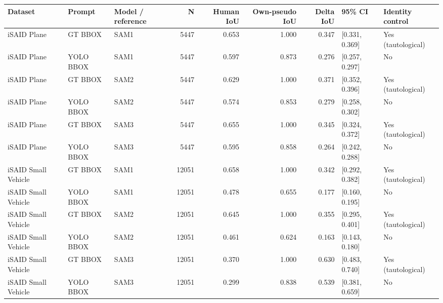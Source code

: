 \begin{tabular}{lllrrrrll}
\toprule
Dataset & Prompt & Model / reference & N & Human IoU & Own-pseudo IoU & Delta IoU & 95\% CI & Identity control \\
\midrule
iSAID Plane & GT BBOX & SAM1 & 5447 & 0.653 & 1.000 & 0.347 & [0.331, 0.369] & Yes (tautological) \\
iSAID Plane & YOLO BBOX & SAM1 & 5447 & 0.597 & 0.873 & 0.276 & [0.257, 0.297] & No \\
iSAID Plane & GT BBOX & SAM2 & 5447 & 0.629 & 1.000 & 0.371 & [0.352, 0.396] & Yes (tautological) \\
iSAID Plane & YOLO BBOX & SAM2 & 5447 & 0.574 & 0.853 & 0.279 & [0.258, 0.302] & No \\
iSAID Plane & GT BBOX & SAM3 & 5447 & 0.655 & 1.000 & 0.345 & [0.324, 0.372] & Yes (tautological) \\
iSAID Plane & YOLO BBOX & SAM3 & 5447 & 0.595 & 0.858 & 0.264 & [0.242, 0.288] & No \\
iSAID Small Vehicle & GT BBOX & SAM1 & 12051 & 0.658 & 1.000 & 0.342 & [0.292, 0.382] & Yes (tautological) \\
iSAID Small Vehicle & YOLO BBOX & SAM1 & 12051 & 0.478 & 0.655 & 0.177 & [0.160, 0.195] & No \\
iSAID Small Vehicle & GT BBOX & SAM2 & 12051 & 0.645 & 1.000 & 0.355 & [0.295, 0.401] & Yes (tautological) \\
iSAID Small Vehicle & YOLO BBOX & SAM2 & 12051 & 0.461 & 0.624 & 0.163 & [0.143, 0.180] & No \\
iSAID Small Vehicle & GT BBOX & SAM3 & 12051 & 0.370 & 1.000 & 0.630 & [0.483, 0.740] & Yes (tautological) \\
iSAID Small Vehicle & YOLO BBOX & SAM3 & 12051 & 0.299 & 0.838 & 0.539 & [0.381, 0.659] & No \\
\bottomrule
\end{tabular}
